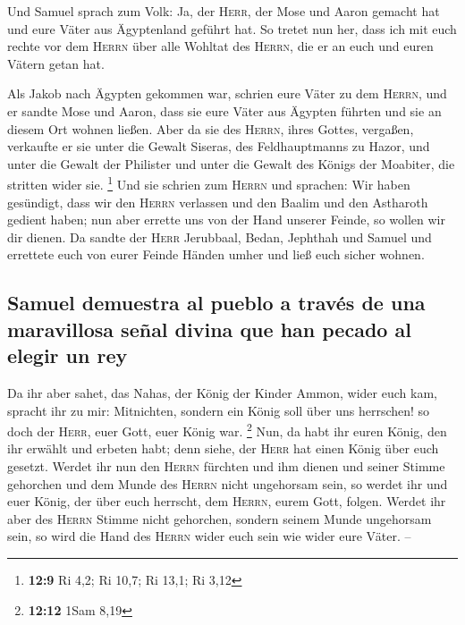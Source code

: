  Und Samuel sprach zum Volk: Ja, der \textsc{Herr}, der
Mose und Aaron gemacht hat und eure Väter aus Ägyptenland geführt hat.
 So tretet nun her, dass ich mit euch rechte vor dem
\textsc{Herrn} über alle Wohltat des \textsc{Herrn}, die er an euch und
euren Vätern getan hat.

 Als Jakob nach Ägypten gekommen war, schrien eure Väter
zu dem \textsc{Herrn}, und er sandte Mose und Aaron, dass sie eure Väter
aus Ägypten führten und sie an diesem Ort wohnen ließen. 
Aber da sie des \textsc{Herrn}, ihres Gottes, vergaßen, verkaufte er sie
unter die Gewalt Siseras, des Feldhauptmanns zu Hazor, und unter die
Gewalt der Philister und unter die Gewalt des Königs der Moabiter, die
stritten wider sie. \footnote{\textbf{12:9} Ri 4,2; Ri 10,7; Ri 13,1; Ri
  3,12}  Und sie schrien zum \textsc{Herrn} und sprachen:
Wir haben gesündigt, dass wir den \textsc{Herrn} verlassen und den
Baalim und den Astharoth gedient haben; nun aber errette uns von der
Hand unserer Feinde, so wollen wir dir dienen.  Da sandte
der \textsc{Herr} Jerubbaal, Bedan, Jephthah und Samuel und errettete
euch von eurer Feinde Händen umher und ließ euch sicher wohnen.

\hypertarget{samuel-demuestra-al-pueblo-a-travuxe9s-de-una-maravillosa-seuxf1al-divina-que-han-pecado-al-elegir-un-rey}{%
\subsection{Samuel demuestra al pueblo a través de una maravillosa señal
divina que han pecado al elegir un
rey}\label{samuel-demuestra-al-pueblo-a-travuxe9s-de-una-maravillosa-seuxf1al-divina-que-han-pecado-al-elegir-un-rey}}

 Da ihr aber sahet, das Nahas, der König der Kinder
Ammon, wider euch kam, spracht ihr zu mir: Mitnichten, sondern ein König
soll über uns herrschen! so doch der \textsc{Herr}, euer Gott, euer
König war. \footnote{\textbf{12:12} 1Sam 8,19}  Nun, da
habt ihr euren König, den ihr erwählt und erbeten habt; denn siehe, der
\textsc{Herr} hat einen König über euch gesetzt.  Werdet
ihr nun den \textsc{Herrn} fürchten und ihm dienen und seiner Stimme
gehorchen und dem Munde des \textsc{Herrn} nicht ungehorsam sein, so
werdet ihr und euer König, der über euch herrscht, dem \textsc{Herrn},
eurem Gott, folgen.  Werdet ihr aber des \textsc{Herrn}
Stimme nicht gehorchen, sondern seinem Munde ungehorsam sein, so wird
die Hand des \textsc{Herrn} wider euch sein wie wider eure Väter. --


